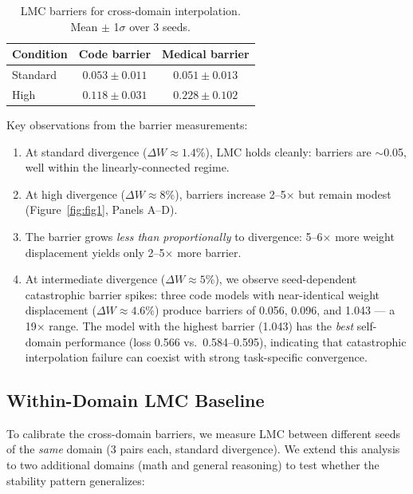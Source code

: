 \documentclass[11pt,a4paper]{article}
\begin{document}
\begin{table}[h]
\centering
\caption{LMC barriers for cross-domain interpolation. Mean $\pm$ 1$\sigma$ over 3 seeds.}
\label{tab:barriers}
\begin{tabular}{@{}lcc@{}}
\toprule
\textbf{Condition} & \textbf{Code barrier} & \textbf{Medical barrier} \\
\midrule
Standard & $0.053 \pm 0.011$ & $0.051 \pm 0.013$ \\
High     & $0.118 \pm 0.031$ & $0.228 \pm 0.102$ \\
\bottomrule
\end{tabular}
\end{table}

Key observations from the barrier measurements:
\begin{enumerate}
    \item At standard divergence ($\Delta W \approx 1.4\%$), LMC holds cleanly: barriers are $\sim$0.05, well within the linearly-connected regime.
    \item At high divergence ($\Delta W \approx 8\%$), barriers increase 2--5$\times$ but remain modest (Figure~\ref{fig:fig1}, Panels A--D).
    \item The barrier grows \emph{less than proportionally} to divergence: 5--6$\times$ more weight displacement yields only 2--5$\times$ more barrier.
    \item At intermediate divergence ($\Delta W \approx 5\%$), we observe seed-dependent catastrophic barrier spikes: three code models with near-identical weight displacement ($\Delta W \approx 4.6\%$) produce barriers of 0.056, 0.096, and 1.043 — a 19$\times$ range. The model with the highest barrier (1.043) has the \emph{best} self-domain performance (loss 0.566 vs.\ 0.584--0.595), indicating that catastrophic interpolation failure can coexist with strong task-specific convergence.
\end{enumerate}

\subsection{Within-Domain LMC Baseline}

To calibrate the cross-domain barriers, we measure LMC between different seeds of the \emph{same} domain (3 pairs each, standard divergence). We extend this analysis to two additional domains (math and general reasoning) to test whether the stability pattern generalizes:
\end{document}
